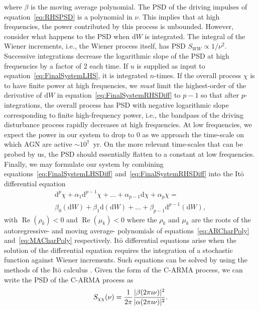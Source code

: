 \documentclass[a4paper,fleqn,usenatbib]{mnras}
\begin{document}
where $\beta$ is the moving average polynomial. The PSD of the driving impulses of equation~\eqref{eq:RHSPSD} is a polynomial in $\nu$. This implies that at high frequencies, the power contributed by this process is unbounded. However, consider what happens to the PSD when $\mathrm{d}W$ is integrated. The integral of the Wiener increments, i.e., the Wiener process itself, has PSD $S_{WW} \propto 1/\nu^{2}$. Successive integrations decrease the logarithmic slope of the PSD at high frequencies by a factor of $2$ each time. If $u$ is supplied as input to equation~\eqref{eq:FinalSystemLHS}, it is integrated $n$-times. If the overall process $\chi$ is to have finite power at high frequencies, we \textit{must} limit the highest-order of the derivative of $\mathrm{d}W$ in equation~\eqref{eq:FinalSystemRHSDiff} to $p-1$ so that after $p$-integrations, the overall process has PSD with negative logarithmic slope corresponding to finite high-frequency power, i.e., the bandpass of the driving disturbance process rapidly decreases at high frequencies. At low frequencies, we expect the power in our system to drop to $0$ as we approach the time-scale on which AGN are active $\sim 10^{7}$~yr. On the more relevant time-scales that can be probed by us, the PSD should essentially flatten to a constant at low frequencies. Finally, we may formulate our system by combining equations~\eqref{eq:FinalSystemLHSDiff} and~\eqref{eq:FinalSystemRHSDiff} into the It\={o} differential equation
\begin{multline}\label{eq:CARMA}
\mathrm{d}^{p}\chi + \alpha_{1} \mathrm{d}^{p-1}\chi + \ldots + \alpha_{p-1} \mathrm{d}\chi + \alpha_{p} \chi = \\ \beta_{0} (\mathrm{d}W) + \beta_{1} \mathrm{d}(\mathrm{d}W) + \ldots + \beta_{p-1} \mathrm{d}^{p-1}(\mathrm{d}W),
\end{multline}
with $\operatorname{Re}(\rho_{k}) < 0$ and $\operatorname{Re}(\mu_{k}) < 0$ where the $\rho_{k}$ and $\mu_{k}$ are the roots of the autoregressive- and moving average- polynomials of equations~\eqref{eq:ARCharPoly} and~\eqref{eq:MACharPoly} respectively. It\={o} differential equations arise when the solution of the differential equation requires the integration of a stochastic function against Wiener increments. Such equations can be solved by using the methods of the It\={o} calculus \citep{Oksendal}. Given the form of the C-ARMA process, we can write the PSD of the C-ARMA process \citep{HandbookOfStatistics19Brockwell} as
\begin{equation}\label{eq:CARMAPSD}
S_{\chi\chi}(\nu) = \frac{1}{2 \pi }\frac{|\beta(2 \pi \imath \nu)|^{2}}{|\alpha(2 \pi \imath \nu)|^{2}}.
\end{equation}
\end{document}
